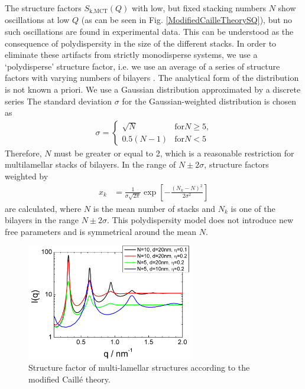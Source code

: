The structure factors $S_\text{k,MCT}(Q)$ with low, but fixed
stacking numbers $N$ show oscillations at low $Q$ (as can be seen in
Fig. \ref{ModifiedCailleTheorySQ}), but no such oscillations are
found in experimental data. This can be understood as the
consequence of polydispersity in the size of the different stacks.
In order to eliminate these artifacts from strictly monodisperse
systems, we use a `polydisperse' structure factor, i.e. we use an
average of a series of structure factors with varying numbers of
bilayers \cite{Fruhwirth2004}. The analytical form of the
distribution is not known a priori. We use a Gaussian distribution
approximated by a discrete series The standard deviation $\sigma$
for the Gaussian-weighted distribution is chosen as
\begin{align}
\sigma =
\begin{cases}
\sqrt{N} & \text{for} N\geq 5 \text{,} \\
0.5(N-1) & \text{for} N< 5
\end{cases}
\end{align}
Therefore, $N$ must be greater or equal to 2, which is a
reasonable restriction for multilamellar stacks of bilayers. In
the range of $N \pm 2\sigma$, structure factors weighted by
\begin{align}
x_k & = \frac{1}{\sigma\sqrt{2\pi}} \exp\left[
-\frac{(N_k-N)^2}{2\sigma^2}\right]
\end{align}
are calculated, where $N$ is the mean number of stacks and $N_k$
is one of the  bilayers in the range $N\pm 2\sigma$. This
polydispersity model does not introduce new free parameters and is
symmetrical around the mean $N$.

\begin{figure}[htb]
\begin{center}
\includegraphics[width=0.65\textwidth,height=0.5\textwidth]{../images/structure_factor/Lamellar/MCLamellar.png}
\end{center}
\caption{Structure factor of multi-lamellar structures according to the modified Caill\'e theory.}
\label{fig:MCLamellar}
\end{figure}

